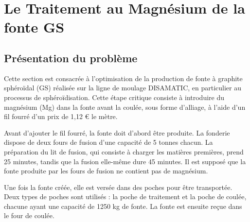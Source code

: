 \documentclass[12pt]{article}
\begin{document}

\section{Le Traitement au Magnésium de la fonte GS}

\subsection{Présentation du problème }



Cette section est consacrée à l'optimisation de la production de fonte à 
graphite sphéroïdal (GS) réalisée sur la ligne de moulage DISAMATIC, en 
particulier au processus de sphéroïdisation. Cette étape critique consiste 
à introduire du magnésium (Mg) dans la fonte avant la coulée, sous forme 
d'alliage, à l'aide d'un fil fourré d'un prix de 1,12 € le mètre.



Avant d'ajouter le fil fourré, la fonte doit d'abord être produite. 
La fonderie dispose de deux fours de fusion d'une capacité de 5 tonnes 
chacun. La préparation du lit de fusion, qui consiste à charger les 
matières premières, prend 25 minutes, tandis que la fusion elle-même 
dure 45 minutes. Il est supposé que la fonte produite par les fours de 
fusion ne contient pas de magnésium.

Une fois la fonte créée, elle est versée dans des poches pour être 
transportée. Deux types de poches sont utilisés : la poche de traitement 
et la poche de coulée, chacune ayant une capacité de 1250 kg de fonte. 
La fonte est ensuite reçue dans le four de coulée.
\end{document}
